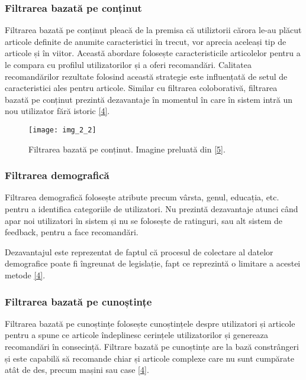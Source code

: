 \subsubsection*{Filtrarea bazată pe conținut}

Filtrarea bazată pe conținut pleacă de la premisa că utiliztorii cărora le-au plăcut articole definite de anumite caracteristici în trecut, vor aprecia aceleași tip de articole și în viitor. Această abordare folosește caracteristicile articolelor pentru a le compara cu profilul utilizatorilor și a oferi recomandări. Calitatea recomandărilor rezultate folosind această strategie este influențată de setul de caracteristici ales pentru articole. Similar cu filtrarea coloborativă, filtrarea bazată pe conținut prezintă dezavantaje în momentul în care în sistem intră un nou utilizator fără istoric \hyperlink{ErionCanoMaurizioMorisio}{[4]}.
\begin{figure}[!h]
	\centering
	\texttt{[image: img\_2\_2]}
	\caption[Filtrarea bazată pe conținut]{Filtrarea bazată pe conținut. Imagine preluată din \hyperlink{datameetsmedia}{[5]}.}
\end{figure} 

\subsubsection*{Filtrarea demografică}

Filtrarea demografică folosește atribute precum vârsta, genul, educația, etc. pentru a identifica categoriile de utilizatori. Nu prezintă dezavantaje atunci când apar noi utilizatori în sistem și nu se folosește de ratinguri, sau alt sistem de feedback, pentru a face recomandări.

Dezavantajul este reprezentat de faptul că procesul de colectare al datelor demografice poate fi îngreunat de legislație, fapt ce reprezintă o limitare a acestei metode \hyperlink{ErionCanoMaurizioMorisio}{[4]}.

\subsubsection*{Filtrarea bazată pe cunoștințe}

Filtrarea bazată pe cunoștințe folosește cunoștințele despre utilizatori și articole pentru a spune ce articole îndeplinesc cerințele utilizatorilor și genereaza recomandări în consecință. Filtrare bazată pe cunoștințe are la bază constrângeri și este capabilă să recomande chiar și articole complexe care nu sunt cumpărate atât de des, precum mașini sau case \hyperlink{ErionCanoMaurizioMorisio}{[4]}.

